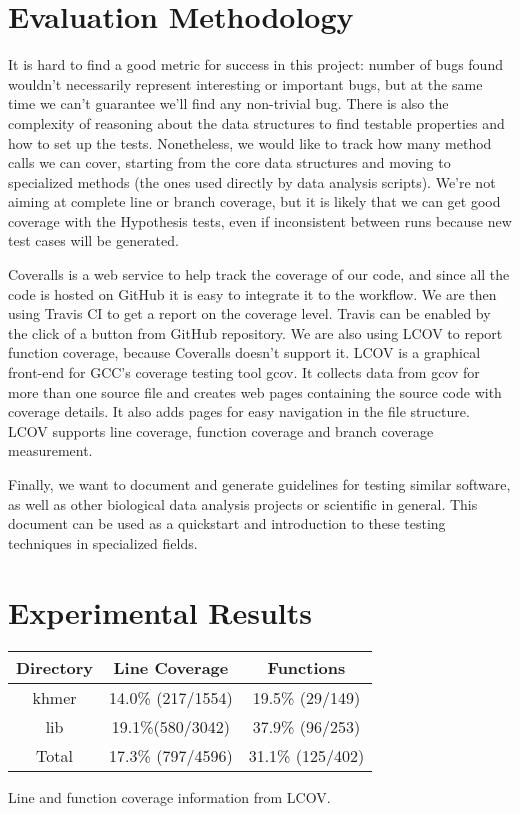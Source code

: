 \documentclass[preprint,nocopyrightspace]{sig-alternate}
\begin{document}
\section{Evaluation Methodology}
It is hard to find a good metric for success in this project:
number of bugs found wouldn't necessarily represent interesting or important bugs,
but at the same time we can't guarantee we'll find any non-trivial bug.
There is also the complexity of reasoning about the data structures to find testable properties and how to set up the tests.
Nonetheless,
we would like to track how many method calls we can cover,
starting from the core data structures and moving to specialized methods (the ones used directly by data analysis scripts).
We're not aiming at complete line or branch coverage,
but it is likely that we can get good coverage with the Hypothesis tests,
even if inconsistent between runs because new test cases will be generated.

Coveralls is a web service to help track the coverage of our code,
and since all the code is hosted on GitHub it is easy to integrate it to the workflow.
We are then using Travis CI to get a report on the coverage level.
Travis can be enabled by the click of a button from GitHub repository.
We are also using LCOV to report function coverage,
because Coveralls doesn't support it.
LCOV is a graphical front-end for GCC's coverage testing tool gcov.
It collects data from gcov for more than one source file and creates web pages containing the
source code with coverage details.
It also adds pages for easy navigation in the file structure.
LCOV supports line coverage, function coverage and branch coverage measurement.

Finally,
we want to document and generate guidelines for testing similar software,
as well as other biological data analysis projects or scientific in general.
This document can be used as a quickstart and introduction to these testing techniques in specialized fields.

\section{Experimental Results}

\noindent
\begin{minipage}{\columnwidth}
  \captionsetup{type=table}
  \centering
  \begin{tabular}{|c|c|c|}
  \toprule
  Directory & Line Coverage & Functions \\
  \midrule
  khmer		& 14.0\% (217/1554)	& 19.5\% (29/149) \\
  lib		& 19.1\%(580/3042)	& 37.9\% (96/253) \\
  Total		& 17.3\% (797/4596)	& 31.1\% (125/402) \\
  \bottomrule
  \end{tabular}
  \medskip

  \caption{Line and function coverage information from LCOV.}\label{table:lcov}
\end{minipage}
\end{document}
